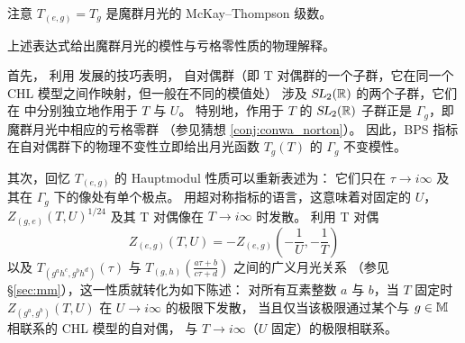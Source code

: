 

注意 $T_{(e,g)}=T_g$ 是魔群月光的 McKay–Thompson 级数。

上述表达式给出魔群月光的模性与亏格零性质的物理解释。


首先，\cite{paquette2016monstrous} 利用 \cite{Persson:2015jka} 发展的技巧表明，
自对偶群（即 T 对偶群的一个子群，它在同一个 CHL 模型之间作映射，但一般在不同的模值处）
涉及 $\operatorname{\textsl{SL}}_2(\mathbb{R})$ 的两个子群，它们在  中分别独立地作用于 $T$ 与 $U$。
特别地，作用于 $T$ 的 $\operatorname{\textsl{SL}}_2(\mathbb{R})$ 子群正是 $\Gamma_g$，即魔群月光中相应的亏格零群
（参见猜想 \ref{conj:conwa_norton}）。
因此，BPS 指标在自对偶群下的物理不变性立即给出月光函数 $T_{g}(T)$ 的 $\Gamma_g$ 不变模性。


其次，回忆 $T_{(e,g)}$ 的 Hauptmodul 性质可以重新表述为：
它们只在 $\tau\rightarrow i\infty$ 及其在 $\Gamma_g$ 下的像处有单个极点。
用超对称指标的语言，这意味着对固定的 $U$，$Z_{(g,e)}(T,U)^{1/24}$ 及其 T 对偶像在 $T\rightarrow i\infty$ 时发散。
利用 T 对偶
\[
Z_{(e,g)}(T,U)=-Z_{(e,g)}\left(-\frac{1}{U},-\frac{1}{T}\right)
\]
以及 $T_{(g^ah^c,g^bh^d)}(\tau)$ 与 $T_{(g,h)}\left(\frac{a\tau+b}{c\tau+d}\right)$ 之间的广义月光关系
（参见 \S\ref{sec:mm}），这一性质就转化为如下陈述：
对所有互素整数 $a$ 与 $b$，当 $T$ 固定时 $Z_{(g^a,g^b)}(T,U)$ 在 $U\to i\infty$ 的极限下发散，
当且仅当该极限通过某个与 $g\in \mathbb{M}$ 相联系的 CHL 模型的自对偶，
与 $T\to i\infty$（$U$ 固定）的极限相联系。

